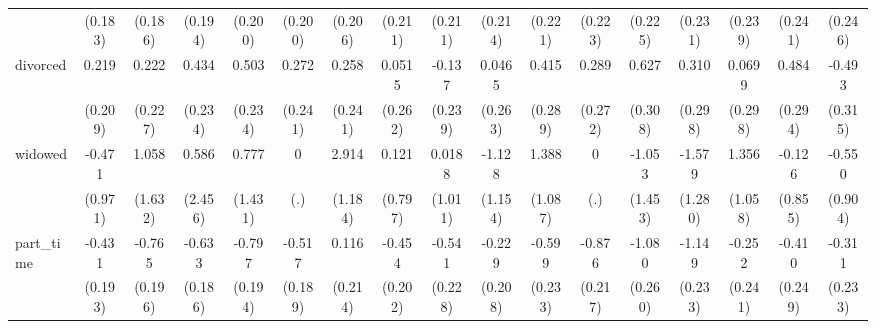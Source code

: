 {\begin{tabular}{l*{16}{c}}
                    &     (0.183)         &     (0.186)         &     (0.194)         &     (0.200)         &     (0.200)         &     (0.206)         &     (0.211)         &     (0.211)         &     (0.214)         &     (0.221)         &     (0.223)         &     (0.225)         &     (0.231)         &     (0.239)         &     (0.241)         &     (0.246)         \\
[1em]
divorced            &       0.219         &       0.222         &       0.434         &       0.503\sym{*}  &       0.272         &       0.258         &      0.0515         &      -0.137         &      0.0465         &       0.415         &       0.289         &       0.627\sym{*}  &       0.310         &      0.0699         &       0.484         &      -0.493         \\
                    &     (0.209)         &     (0.227)         &     (0.234)         &     (0.234)         &     (0.241)         &     (0.241)         &     (0.262)         &     (0.239)         &     (0.263)         &     (0.289)         &     (0.272)         &     (0.308)         &     (0.298)         &     (0.298)         &     (0.294)         &     (0.315)         \\
[1em]
widowed             &      -0.471         &       1.058         &       0.586         &       0.777         &           0         &       2.914\sym{*}  &       0.121         &      0.0188         &      -1.128         &       1.388         &           0         &      -1.053         &      -1.579         &       1.356         &      -0.126         &      -0.550         \\
                    &     (0.971)         &     (1.632)         &     (2.456)         &     (1.431)         &         (.)         &     (1.184)         &     (0.797)         &     (1.011)         &     (1.154)         &     (1.087)         &         (.)         &     (1.453)         &     (1.280)         &     (1.058)         &     (0.855)         &     (0.904)         \\
[1em]
part\_time           &      -0.431\sym{*}  &      -0.765\sym{***}&      -0.633\sym{***}&      -0.797\sym{***}&      -0.517\sym{**} &       0.116         &      -0.454\sym{*}  &      -0.541\sym{*}  &      -0.229         &      -0.599\sym{*}  &      -0.876\sym{***}&      -1.080\sym{***}&      -1.149\sym{***}&      -0.252         &      -0.410         &      -0.311         \\
                    &     (0.193)         &     (0.196)         &     (0.186)         &     (0.194)         &     (0.189)         &     (0.214)         &     (0.202)         &     (0.228)         &     (0.208)         &     (0.233)         &     (0.217)         &     (0.260)         &     (0.233)         &     (0.241)         &     (0.249)         &     (0.233)         \\

\end{tabular}}

